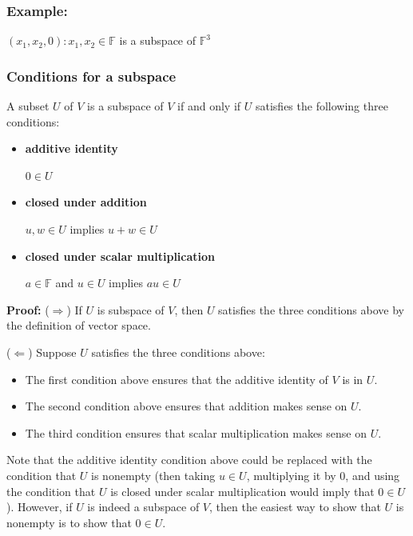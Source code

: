 \documentclass{report}
\begin{document}
\subsubsection{Example:}
${(x_1,x_2,0):x_1,x_2 \in \mathbb{F}}$ is a subspace of $\mathbb{F}^3$

\subsubsection{Conditions for a subspace}
A subset $U$ of $V$ is a subspace of $V$ if and only if $U$ satisfies the following three conditions:\newline
\begin{itemize}
	\item \textbf{additive identity}\newline
    	\centerline{$0 \in U$}
    \item \textbf{closed under addition}\newline
    	\centerline{$u,w \in U$ implies $u+w \in U$}
    \item \textbf{closed under scalar multiplication}\newline
    	\centerline{$a \in \mathbb{F}$ and $u \in U$ implies $au \in U$}
\end{itemize}

\noindent \textbf{Proof:}\newline
\noindent ($\Rightarrow$)\newline
If $U$ is subspace of $V$, then $U$ satisfies the three conditions above by the definition of vector space.\newline

\noindent ($\Leftarrow$) Suppose $U$ satisfies the three conditions above:
\begin{itemize}
    \item The first condition above ensures that the additive identity of $V$ is in $U$.
    \item The second condition above ensures that addition makes sense on $U$.
    \item The third condition ensures that scalar multiplication makes sense on $U$.
\end{itemize}

\noindent Note that the additive identity condition above could be replaced with the condition that $U$ is nonempty (then taking $u \in U$, multiplying it by $0$, and using the condition that $U$ is closed under scalar multiplication would imply that $0 \in U$). However, if $U$ is indeed a subspace of $V$, then the easiest way to show that $U$ is nonempty is to show that $0 \in U$.
\end{document}
